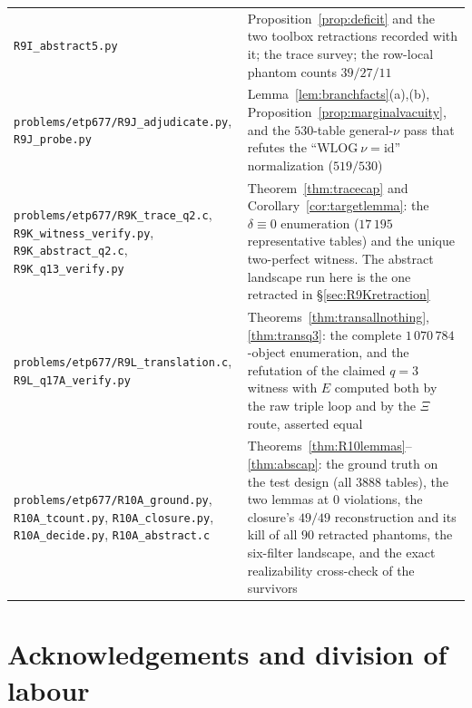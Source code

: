 \documentclass[11pt]{article}
\theoremstyle{plain}
\theoremstyle{definition}
\theoremstyle{remark}
\numberwithin{equation}{section}
\begin{document}
\begin{longtable}{p{}p{}}
\texttt{R9I\_abstract5.py} & Proposition~\ref{prop:deficit} and the two toolbox
retractions recorded with it; the trace survey; the row-local phantom counts
$39/27/11$\\
\texttt{problems\slash etp677\slash R9J\_adjudicate.py},\newline
\texttt{R9J\_probe.py} & Lemma~\ref{lem:branchfacts}(a),(b),
Proposition~\ref{prop:marginalvacuity}, and the $530$-table general-$\nu$ pass that
refutes the ``$\mathrm{WLOG}\ \nu = \mathrm{id}$'' normalization ($519/530$)\\
\texttt{problems\slash etp677\slash R9K\_trace\_q2.c},\newline
\texttt{R9K\_witness\_verify.py}, \texttt{R9K\_abstract\_q2.c},
\texttt{R9K\_q13\_verify.py} & Theorem~\ref{thm:tracecap} and
Corollary~\ref{cor:targetlemma}: the $\delta\equiv0$ enumeration
($17\,195$ representative tables) and the unique two-perfect witness. The abstract
landscape run here is the one retracted in \S\ref{sec:R9Kretraction}\\
\texttt{problems\slash etp677\slash R9L\_translation.c},\newline
\texttt{R9L\_q17A\_verify.py} & Theorems~\ref{thm:transallnothing},
\ref{thm:transq3}: the complete $1\,070\,784$-object enumeration, and the refutation
of the claimed $q = 3$ witness with $E$ computed both by the raw triple loop and by
the $\Xi$ route, asserted equal\\
\texttt{problems\slash etp677\slash R10A\_ground.py},\newline
\texttt{R10A\_tcount.py}, \texttt{R10A\_closure.py}, \texttt{R10A\_decide.py},
\texttt{R10A\_abstract.c} & Theorems~\ref{thm:R10lemmas}--\ref{thm:abscap}: the
ground truth on the test design (all $3888$ tables), the two lemmas at $0$
violations, the closure's $49/49$ reconstruction and its kill of all $90$ retracted
phantoms, the six-filter landscape, and the exact realizability cross-check of the
survivors\\
\bottomrule
\end{longtable}

\section*{Acknowledgements and division of labour}
\end{document}
